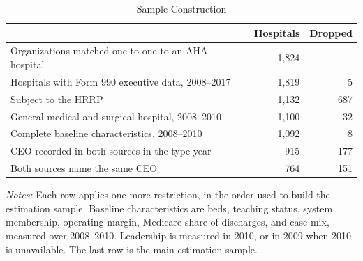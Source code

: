 \begin{table}

\caption{\label{tab:sample}Sample Construction}
\centering
\begin{threeparttable}
\begin{tabular}[t]{lrr}
\toprule
 & Hospitals & Dropped\\
\midrule
Organizations matched one-to-one to an AHA hospital & 1,824 & \\
\hspace{1em}Hospitals with Form 990 executive data, 2008--2017 & 1,819 & 5\\
\hspace{1em}Subject to the HRRP & 1,132 & 687\\
\hspace{1em}General medical and surgical hospital, 2008--2010 & 1,100 & 32\\
\hspace{1em}Complete baseline characteristics, 2008--2010 & 1,092 & 8\\
\hspace{1em}CEO recorded in both sources in the type year & 915 & 177\\
\hspace{1em}Both sources name the same CEO & 764 & 151\\
\bottomrule
\end{tabular}
\begin{tablenotes}[flushleft]
\footnotesize
\item \textit{Notes:} Each row applies one more restriction, in the order used to build the estimation sample. Baseline characteristics are beds, teaching status, system membership, operating margin, Medicare share of discharges, and case mix, measured over 2008--2010. Leadership is measured in 2010, or in 2009 when 2010 is unavailable. The last row is the main estimation sample.
\end{tablenotes}
\end{threeparttable}
\end{table}

